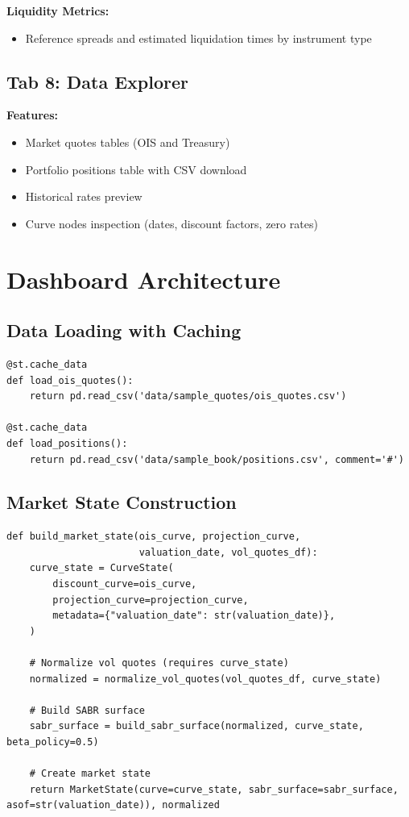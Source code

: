 \documentclass[12pt,a4paper]{report}
\begin{document}
\textbf{Liquidity Metrics:}
\begin{itemize}
    \item Reference spreads and estimated liquidation times by instrument type
\end{itemize}

\subsection{Tab 8: Data Explorer}

\textbf{Features:}
\begin{itemize}
    \item Market quotes tables (OIS and Treasury)
    \item Portfolio positions table with CSV download
    \item Historical rates preview
    \item Curve nodes inspection (dates, discount factors, zero rates)
\end{itemize}

\section{Dashboard Architecture}

\subsection{Data Loading with Caching}

\begin{lstlisting}
@st.cache_data
def load_ois_quotes():
    return pd.read_csv('data/sample_quotes/ois_quotes.csv')

@st.cache_data
def load_positions():
    return pd.read_csv('data/sample_book/positions.csv', comment='#')
\end{lstlisting}

\subsection{Market State Construction}

\begin{lstlisting}
def build_market_state(ois_curve, projection_curve, 
                       valuation_date, vol_quotes_df):
    curve_state = CurveState(
        discount_curve=ois_curve,
        projection_curve=projection_curve,
        metadata={"valuation_date": str(valuation_date)},
    )
    
    # Normalize vol quotes (requires curve_state)
    normalized = normalize_vol_quotes(vol_quotes_df, curve_state)
    
    # Build SABR surface
    sabr_surface = build_sabr_surface(normalized, curve_state, beta_policy=0.5)
    
    # Create market state
    return MarketState(curve=curve_state, sabr_surface=sabr_surface, asof=str(valuation_date)), normalized
\end{lstlisting}
\end{document}
